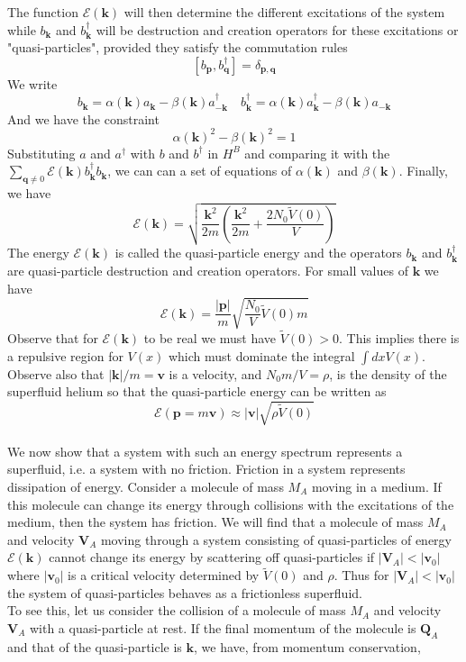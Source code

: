 The function $\mathcal{E}(\bm{k})$  will then determine the different excitations of the system while $b_{\bm{k}}$ and $b^{\dagger}_{\bm{k}}$ will be destruction and creation operators for these excitations or "quasi-particles", provided they satisfy the commutation rules
\[[b_{\bm{p}},b_{\bm{q}}^{\dagger}] = \delta_{\bm{p},\bm{q}}\]
We write
\[b_{\bm{k}} = \alpha(\bm{k})a_{\bm{k}} - \beta(\bm{k})a^{\dagger}_{-\bm{k}} \quad b^{\dagger}_{\bm{k}} = \alpha(\bm{k})a^{\dagger}_{\bm{k}} - \beta(\bm{k})a_{-\bm{k}} \]
And we have the constraint
\[\alpha(\bm{k})^2 - \beta(\bm{k})^2 = 1\]
Substituting $a$ and $a^{\dagger}$ with $b$ and $b^{\dagger}$ in $H^B$ and comparing it with the $\sum_{\bm{q} \neq 0} \mathcal{E}(\bm{k})b^{\dagger}_{\bm{k}} b_{\bm{k}}$, we can can a set of equations of $\alpha(\bm{k})$ and $\beta(\bm{k})$. Finally, we have
\[\mathcal{E}(\bm{k}) = \sqrt{\frac{\bm{k}^2}{2m} \left(\frac{\bm{k}^2}{2m} + \frac{2N_0\tilde{V}(0)}{V} \right) }\]
The energy $\mathcal{E}(\bm{k})$ is called the quasi-particle energy and the operators $b_{\bm{k}}$ and $b^{\dagger}_{\bm{k}}$ are quasi-particle destruction and creation operators. 
For small values of $\bm{k}$ we have
\[\mathcal{E}(\bm{k}) = \frac{|\bm{p}|}{m} \sqrt{\frac{N_0}{V}\tilde{V}(0)m}\]
Observe that for $\mathcal{E}(\bm{k})$ to be real we must have $\tilde{V}(0) > 0$. This implies there is a repulsive region for $V(x)$ which must dominate the integral $\int dx V(x)$. Observe also that $|\bm{k}|/m = \bm{v}$ is a velocity, and $N_0m/V = \rho$, is the density of the superfluid helium so that the quasi-particle energy can be written as 
\[\mathcal{E}(\bm{p} = m\bm{v}) \approx |\bm{v}|\sqrt{\rho\tilde{V}(0)}\]
\\
We now show that a system with such an energy spectrum represents a superfluid, i.e. a system with no friction.
Friction in a system represents dissipation of energy.
Consider a molecule of mass $M_A$ moving in a medium. If this molecule can change its energy through collisions with the excitations of the medium, then the system has friction. 
We will find that a molecule of mass $M_A$ and velocity $\bm{V}_A$ moving through a system consisting of quasi-particles of energy $\mathcal{E}(\bm{k})$ cannot change its energy by scattering off quasi-particles if $|\bm{V}_A| < |\bm{v}_0|$ where $|\bm{v}_0|$ is a critical velocity determined by $\tilde{V}(0)$ and $\rho$. 
Thus for $|\bm{V}_A| < |\bm{v}_0|$ the system of quasi-particles behaves as a frictionless superfluid.
\\
To see this, let us consider the collision of a molecule of mass $M_A$ and velocity $\bm{V}_A$ with a quasi-particle at rest. If the final momentum of the molecule is $\bm{Q}_A$ and that of the quasi-particle is $\bm{k}$, we have, from momentum conservation,
